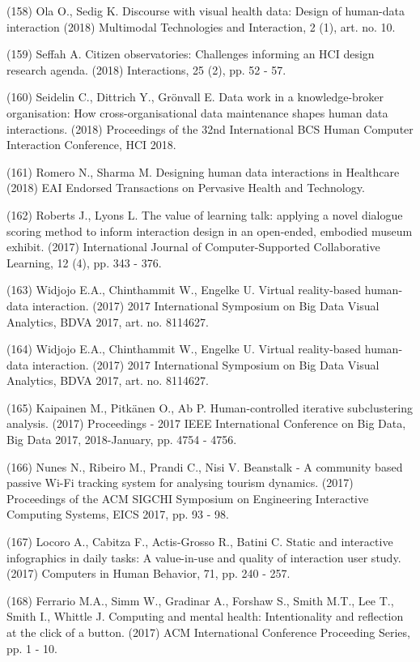 \documentclass[
	12pt,				%
	oneside,			%
	a4paper,			%
	english,			%
	brazil				%
	]{abntex2ppgsi}
\begin{document}
\begin{apendicesenv}
(158) Ola O., Sedig K. Discourse with visual health data: Design of human-data interaction (2018) Multimodal Technologies and Interaction, 2 (1), art. no. 10.

(159) Seffah A. Citizen observatories: Challenges informing an HCI design research agenda. (2018) Interactions, 25 (2), pp. 52 - 57.

(160) Seidelin C., Dittrich Y., Grönvall E. Data work in a knowledge-broker organisation: How cross-organisational data maintenance shapes human data interactions. (2018) Proceedings of the 32nd International BCS Human Computer Interaction Conference, HCI 2018.

(161) Romero N., Sharma M. Designing human data interactions in Healthcare (2018) EAI Endorsed Transactions on Pervasive Health and Technology.

(162) Roberts J., Lyons L. The value of learning talk: applying a novel dialogue scoring method to inform interaction design in an open-ended, embodied museum exhibit. (2017) International Journal of Computer-Supported Collaborative Learning, 12 (4), pp. 343 - 376.

(163) Widjojo E.A., Chinthammit W., Engelke U. Virtual reality-based human-data interaction. (2017) 2017 International Symposium on Big Data Visual Analytics, BDVA 2017, art. no. 8114627.


(164) Widjojo E.A., Chinthammit W., Engelke U. Virtual reality-based human-data interaction. (2017) 2017 International Symposium on Big Data Visual Analytics, BDVA 2017, art. no. 8114627.

(165) Kaipainen M., Pitkänen O., Ab P. Human-controlled iterative subclustering analysis. (2017) Proceedings - 2017 IEEE International Conference on Big Data, Big Data 2017, 2018-January, pp. 4754 - 4756.

(166) Nunes N., Ribeiro M., Prandi C., Nisi V. Beanstalk - A community based passive Wi-Fi tracking system for analysing tourism dynamics. (2017) Proceedings of the ACM SIGCHI Symposium on Engineering Interactive Computing Systems, EICS 2017, pp. 93 - 98.

(167) Locoro A., Cabitza F., Actis-Grosso R., Batini C. Static and interactive infographics in daily tasks: A value-in-use and quality of interaction user study. (2017) Computers in Human Behavior, 71, pp. 240 - 257.

(168) Ferrario M.A., Simm W., Gradinar A., Forshaw S., Smith M.T., Lee T., Smith I., Whittle J. Computing and mental health: Intentionality and reflection at the click of a button. (2017) ACM International Conference Proceeding Series, pp. 1 - 10.


\end{apendicesenv}
\end{document}
